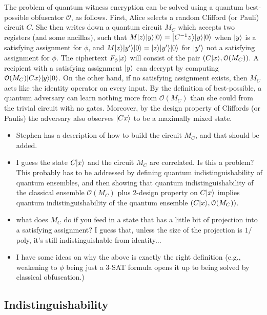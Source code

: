 \documentclass[11pt]{article}
\numberwithin{equation}{section}
\begin{document}
The problem of quantum witness encryption can be solved using a quantum best-possible obfuscator $\mathcal O$, as follows. First, Alice selects a random Clifford (or Pauli) circuit $C$. She then writes down a quantum circuit $M_C$ which accepts two registers (and some ancillas), such that $M {\left\vert{z}\right\rangle} {\left\vert{y}\right\rangle} {\left\vert{0}\right\rangle} = {\left\vert{C^{-1}z}\right\rangle} {\left\vert{y}\right\rangle} {\left\vert{0}\right\rangle}$ when ${\left\vert{y}\right\rangle}$ is a satisfying assignment for $\phi$, and $M {\left\vert{z}\right\rangle} {\left\vert{y'}\right\rangle} {\left\vert{0}\right\rangle} = {\left\vert{z}\right\rangle} {\left\vert{y'}\right\rangle} {\left\vert{0}\right\rangle}$ for ${\left\vert{y'}\right\rangle}$ not a satisfying assignment for $\phi$. The ciphertext $F_\phi {\left\vert{x}\right\rangle}$ will consist of the pair $(C {\left\vert{x}\right\rangle}, \mathcal O(M_C))$. A recipient with a satisfying assignment ${\left\vert{y}\right\rangle}$ can decrypt by computing $\mathcal O(M_C) {\left\vert{Cx}\right\rangle} {\left\vert{y}\right\rangle} {\left\vert{0}\right\rangle}$. On the other hand, if no satisfying assignment exists, then $M_C$ acts like the identity operator on every input. By the definition of best-possible, a quantum adversary can learn nothing more from $\mathcal O(M_C)$ than she could from the trivial circuit with no gates. Moreover, by the design property of Cliffords (or Paulis) the adversary also observes ${\left\vert{Cx}\right\rangle}$ to be a maximally mixed state.

\begin{itemize}
\item Stephen has a description of how to build the circuit $M_C$, and that should be added.
\item I guess the state $C {\left\vert{x}\right\rangle}$ and the circuit $M_C$ are correlated. Is this a problem? This probably has to be addressed by defining quantum indistinguishability of quantum ensembles, and then showing that quantum indistinguishability of the classical ensemble $\mathcal O(M_C)$ plus 2-design property on $C {\left\vert{x}\right\rangle}$ implies quantum indistinguishability of the quantum ensemble $(C {\left\vert{x}\right\rangle}, \mathcal O(M_C))$.
\item what does $M_C$ do if you feed in a state that has a little bit of projection into a satisfying assignment? I guess that, unless the size of the projection is $1/$poly, it's still indistinguishable from identity...
\item I have some ideas on why the above is exactly the right definition (e.g., weakening to $\phi$ being just a 3-SAT formula opens it up to being solved by classical obfuscation.) 
\end{itemize}

\subsection{Indistinguishability}
\end{document}
